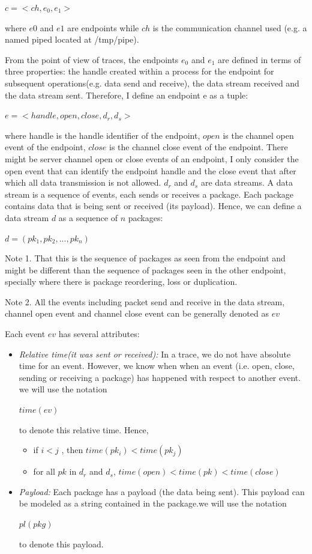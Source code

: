 $c =<ch, e_0, e_1>$

where $e0$ and $e1$ are endpoints while $ch$ is the communication channel used (e.g. a named piped located at /tmp/pipe).

From the point of view of traces, the endpoints $e_0$ and $e_1$ are defined in terms of three properties: the handle created within a process for the endpoint for subsequent operations(e.g. data send and receive), the data stream received and the data stream sent. Therefore, I define an endpoint e as a tuple:

$ e =<handle, open, close, d_r, d_s>$

where handle is the handle identifier of the endpoint, $open$ is the channel open event of the endpoint, $close$ is the channel close event of the endpoint. There might be server channel open or close events of an endpoint, I only consider the open event that can identify the endpoint handle and the close event that after which all data transmission is not allowed. $d_r$ and $d_s$ are data streams. A data stream is a sequence of events, each sends or receives a package. Each package contains data that is being sent or received (its payload). Hence, we can define a data stream $d$ as a sequence of $n$ packages:

$ d = (pk_1, pk_2, ..., pk_n)$ 

Note 1. That this is the sequence of packages as seen from the endpoint and might be different than the sequence of packages seen in the other endpoint, specially where there is package reordering, loss or duplication.

Note 2. All the events including packet send and receive in the data stream, channel open event and channel close event can be generally denoted as $ev$

Each event $ev$ has several attributes:
\begin{itemize}
\item \textit{Relative time(it was sent or received):} In a trace, we do not have absolute time for an event. However, we know when when an event (i.e. open, close, sending or receiving a package) has happened with respect to another event. we will use the notation 

$time(ev)$

to denote this relative time. Hence, 
\begin{itemize}
\item  if  $i < j $ , then  $time(pk_i) < time(pk_j)$

\item  for all $pk$ in $d_r$ and $d_s$, $time(open) < time(pk) < time(close)$
\end{itemize}

\item \textit{Payload:} Each package has a payload (the data being sent). This payload can be modeled as a string contained in the package.we will use the notation 

$pl(pkg)$ 

to denote this payload. 

\end{itemize}


